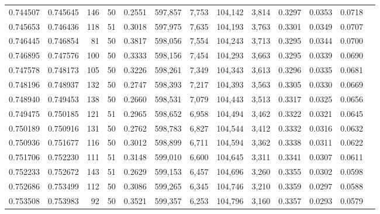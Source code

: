 \begin{tabular}{rrrrrrrrrrrrr}
0.744507 & 0.745645 &   146 &  50 &                                     0.2551 & 597,857 &   7,753 & 104,142 &   3,814 & 0.3297 & 0.0353 & 0.0718 \\
0.745653 & 0.746436 &   118 &  51 &                                     0.3018 & 597,975 &   7,635 & 104,193 &   3,763 & 0.3301 & 0.0349 & 0.0707 \\
0.746445 & 0.746854 &    81 &  50 &                                     0.3817 & 598,056 &   7,554 & 104,243 &   3,713 & 0.3295 & 0.0344 & 0.0700 \\
0.746895 & 0.747576 &   100 &  50 &                                     0.3333 & 598,156 &   7,454 & 104,293 &   3,663 & 0.3295 & 0.0339 & 0.0690 \\
0.747578 & 0.748173 &   105 &  50 &                                     0.3226 & 598,261 &   7,349 & 104,343 &   3,613 & 0.3296 & 0.0335 & 0.0681 \\
0.748196 & 0.748937 &   132 &  50 &                                     0.2747 & 598,393 &   7,217 & 104,393 &   3,563 & 0.3305 & 0.0330 & 0.0669 \\
0.748940 & 0.749453 &   138 &  50 &                                     0.2660 & 598,531 &   7,079 & 104,443 &   3,513 & 0.3317 & 0.0325 & 0.0656 \\
0.749475 & 0.750185 &   121 &  51 &                                     0.2965 & 598,652 &   6,958 & 104,494 &   3,462 & 0.3322 & 0.0321 & 0.0645 \\
0.750189 & 0.750916 &   131 &  50 &                                     0.2762 & 598,783 &   6,827 & 104,544 &   3,412 & 0.3332 & 0.0316 & 0.0632 \\
0.750936 & 0.751677 &   116 &  50 &                                     0.3012 & 598,899 &   6,711 & 104,594 &   3,362 & 0.3338 & 0.0311 & 0.0622 \\
0.751706 & 0.752230 &   111 &  51 &                                     0.3148 & 599,010 &   6,600 & 104,645 &   3,311 & 0.3341 & 0.0307 & 0.0611 \\
0.752233 & 0.752672 &   143 &  51 &                                     0.2629 & 599,153 &   6,457 & 104,696 &   3,260 & 0.3355 & 0.0302 & 0.0598 \\
0.752686 & 0.753499 &   112 &  50 &                                     0.3086 & 599,265 &   6,345 & 104,746 &   3,210 & 0.3359 & 0.0297 & 0.0588 \\
0.753508 & 0.753983 &    92 &  50 &                                     0.3521 & 599,357 &   6,253 & 104,796 &   3,160 & 0.3357 & 0.0293 & 0.0579 \\

\end{tabular}
